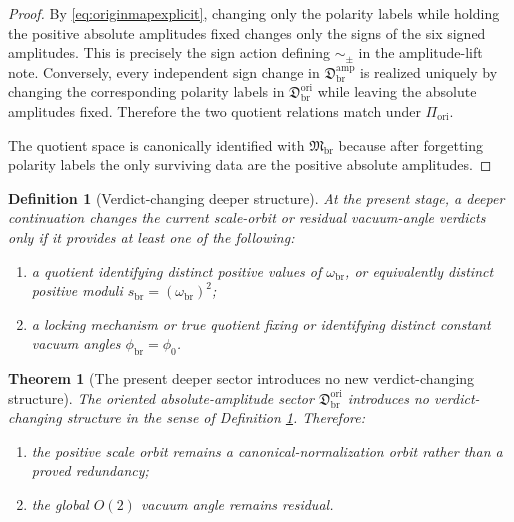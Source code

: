 \documentclass[11pt]{article}
\newcommand{\RespVacPhase}{\phi_{\mathrm{br}}}
\newcommand{\ScaleMod}{s_{\mathrm{br}}}
\newcommand{\LiftSector}{\mathfrak D_{\mathrm{br}}^{\mathrm{amp}}}
\newcommand{\SignQuot}{\sim_{\pm}}
\newcommand{\AbsAmpSector}{\mathfrak M_{\mathrm{br}}}
\newcommand{\OriginSector}{\mathfrak D_{\mathrm{br}}^{\mathrm{ori}}}
\newcommand{\AbsScaleAmp}{\omega_{\mathrm{br}}}
\newcommand{\OriginMap}{\Pi_{\mathrm{ori}}}
\newtheorem{definition}{Definition}
\newtheorem{theorem}{Theorem}
\begin{document}
\begin{proof}
By \eqref{eq:originmapexplicit}, changing only the polarity labels while holding the positive absolute amplitudes fixed changes only the signs of the six signed amplitudes. This is precisely the sign action defining \(\SignQuot\) in the amplitude-lift note. Conversely, every independent sign change in \(\LiftSector\) is realized uniquely by changing the corresponding polarity labels in \(\OriginSector\) while leaving the absolute amplitudes fixed. Therefore the two quotient relations match under \(\OriginMap\).

The quotient space is canonically identified with \(\AbsAmpSector\) because after forgetting polarity labels the only surviving data are the positive absolute amplitudes.
\end{proof}

\begin{definition}[Verdict-changing deeper structure]
\label{def:verdictchange}
At the present stage, a deeper continuation changes the current scale-orbit or residual vacuum-angle verdicts only if it provides at least one of the following:
\begin{enumerate}
    \item a quotient identifying distinct positive values of \(\AbsScaleAmp\), or equivalently distinct positive moduli \(\ScaleMod=(\AbsScaleAmp)^2\);
    \item a locking mechanism or true quotient fixing or identifying distinct constant vacuum angles \(\RespVacPhase=\phi_0\).
\end{enumerate}
\end{definition}

\begin{theorem}[The present deeper sector introduces no new verdict-changing structure]
\label{thm:verdict}
The oriented absolute-amplitude sector \(\OriginSector\) introduces no verdict-changing structure in the sense of Definition \ref{def:verdictchange}. Therefore:
\begin{enumerate}
    \item the positive scale orbit remains a canonical-normalization orbit rather than a proved redundancy;
    \item the global \(O(2)\) vacuum angle remains residual.
\end{enumerate}
\end{theorem}
\end{document}
